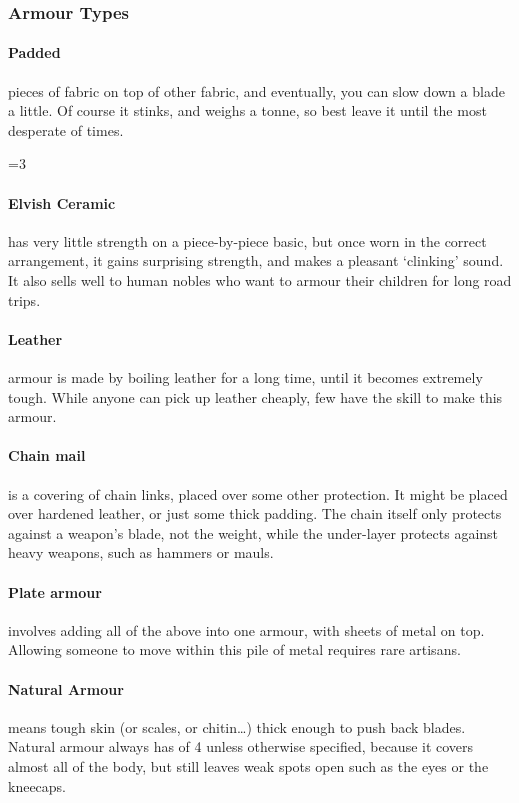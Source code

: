 \begin{multicols}{2}
\subsubsection{Armour Types}

\paragraph{Padded}
pieces of fabric on top of other fabric, and eventually, you can slow down a blade a little.
Of course it stinks, and weighs a tonne, so best leave it until the most desperate of times.

\ifnum\value{r4}=3
  \paragraph{Elvish Ceramic}
  has very little strength on a piece-by-piece basic, but once worn in the correct arrangement, it gains surprising strength, and makes a pleasant `clinking' sound.
  It also sells well to human nobles who want to armour their children for long road trips. 
\fi

\paragraph{Leather}
armour is made by boiling leather for a long time, until it becomes extremely tough.
While anyone can pick up leather cheaply, few have the skill to make this armour.

\paragraph{Chain mail}
is a covering of chain links, placed over some other protection.
It might be placed over hardened leather, or just some thick padding.
The chain itself only protects against a weapon's blade, not the weight, while the under-layer protects against heavy weapons, such as hammers or mauls.

\paragraph{Plate armour}
involves adding all of the above into one armour, with sheets of metal on top.
Allowing someone to move within this pile of metal requires rare artisans.


\paragraph{Natural Armour}
means tough skin (or scales, or chitin\ldots) thick enough to push back blades.
Natural armour always has  of 4 unless otherwise specified, because it covers almost all of the body, but still leaves weak spots open such as the eyes or the kneecaps.


\end{multicols}
